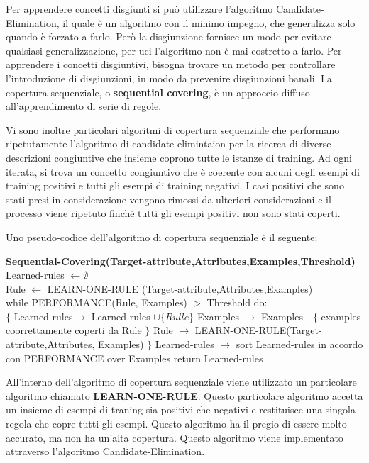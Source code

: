 \documentclass[a4paper]{extarticle}
\begin{document}
Per apprendere concetti disgiunti si può utilizzare l'algoritmo Candidate-Elimination, il quale è un algoritmo con il minimo impegno, che generalizza solo quando è forzato a farlo. Però la disgiunzione fornisce un modo per evitare qualsiasi generalizzazione, per uci l'algoritmo non è mai costretto a farlo. Per apprendere i concetti disgiuntivi, bisogna trovare un metodo per controllare l'introduzione di disgiunzioni, in modo da prevenire disgiunzioni banali. La copertura sequenziale, o \textbf{sequential covering}, è un approccio diffuso all'apprendimento di serie di regole.

Vi sono inoltre particolari algoritmi di copertura sequenziale che performano ripetutamente l'algoritmo di candidate-elimintaion per la ricerca di diverse descrizioni congiuntive che insieme coprono tutte le istanze di training. Ad ogni iterata, si trova un concetto congiuntivo che è coerente con alcuni degli esempi di training positivi e tutti gli esempi di training negativi. I casi positivi che sono stati presi in considerazione vengono rimossi da ulteriori considerazioni e il processo viene ripetuto finché tutti gli esempi positivi non sono stati coperti.

Uno pseudo-codice dell'algoritmo di copertura sequenziale è il seguente:

\textbf{Sequential-Covering(Target-attribute,Attributes,Examples,Threshold)}\\
Learned-rules $\leftarrow \emptyset$\\
Rule $\leftarrow$ LEARN-ONE-RULE (Target-attribute,Attributes,Examples)\\
while PERFORMANCE(Rule, Examples) $>$ Threshold do:\\
$\{$
Learned-rules$\rightarrow$ Learned-rules $\cup \{ Rulle \}$
Examples $\rightarrow$ Examples - $\{$ examples coorrettamente coperti da Rule $\}$
Rule $\rightarrow$ LEARN-ONE-RULE(Target-attribute,Attributes, Examples)
$\}$
Learned-rules $\rightarrow$ sort Learned-rules in accordo con PERFORMANCE over Examples
return Learned-rules


All'interno dell'algoritmo di copertura sequenziale viene utilizzato un particolare algoritmo chiamato \textbf{LEARN-ONE-RULE}. Questo particolare algoritmo accetta un insieme di esempi di traning sia positivi che negativi e restituisce una singola regola che copre tutti gli esempi. Questo algoritmo ha il pregio di essere molto accurato, ma non ha un'alta copertura. Questo algoritmo viene implementato attraverso l'algoritmo Candidate-Elimination. 
\end{document}
